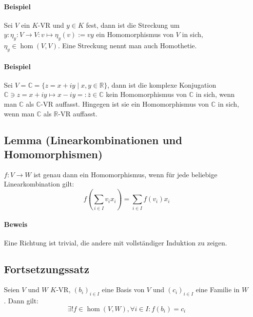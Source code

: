 \paragraph{Beispiel}
	Sei $ V $ ein $ K $-VR und $y\in K$ fest, dann ist die Streckung um $y: \eta_y:V\to V: v\mapsto \eta_y(v) := vy$ ein Homomorphismus von $ V $ in sich, $\eta_y\in \hom(V,V)$. Eine Streckung nennt man auch Homothetie.
  	
\paragraph{Beispiel}
	Sei $V = \mathbb{C} = \{z = x+iy\mid x,y\in \mathbb{R}\}$, dann ist die komplexe Konjugation $\mathbb{C}\ni z = x+iy \mapsto x-iy =: \bar{z} \in \mathbb{C}$ kein Homomorphismus von $\mathbb{C}$ in sich, wenn man $\mathbb{C}$ als $\mathbb{C}$-VR auffasst. Hingegen ist sie ein Homomorphismus von $\mathbb{C}$ in sich, wenn man $\mathbb{C}$ als $ \mathbb{R} $-VR auffasst.
	
\subsection{Lemma (Linearkombinationen und Homomorphismen)}
	\begin{Lemma}
		$f:V\to W$ ist genau dann ein Homomorphismus, wenn für jede beliebige Linearkombination gilt:
		\begin{equation*}
                    f\left(\sum_{i\in I}v_ix_i\right) = \sum_{i\in I}f(v_i)x_i
		\end{equation*}
	\end{Lemma}

\paragraph{Beweis}
	Eine Richtung ist trivial, die andere mit vollständiger Induktion zu zeigen.

\subsection{Fortsetzungssatz} 
	\begin{Satz}[Fortsetzungssatz]
		Seien $ V $ und $ W $ $K$-VR, $(b_i)_{i\in I}$ eine Basis von $ V $ und $(c_i)_{i\in I}$ eine Familie in $ W $.
	Dann gilt:
	\begin{equation*}
            \exists!f\in \hom(V,W), \forall i\in I: f(b_i) = c_i
        \end{equation*}
	\end{Satz}
    
